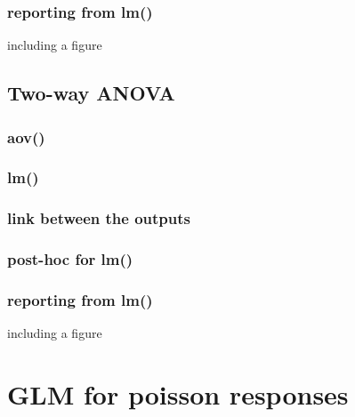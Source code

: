 \documentclass[
]{book}
\begin{document}
\hypertarget{reporting-from-lm-1}{%
\subsection{reporting from lm()}\label{reporting-from-lm-1}}

including a figure

\hypertarget{two-way-anova}{%
\section{Two-way ANOVA}\label{two-way-anova}}

\hypertarget{aov-1}{%
\subsection{aov()}\label{aov-1}}

\hypertarget{lm-2}{%
\subsection{lm()}\label{lm-2}}

\hypertarget{link-between-the-outputs-2}{%
\subsection{link between the outputs}\label{link-between-the-outputs-2}}

\hypertarget{post-hoc-for-lm-1}{%
\subsection{post-hoc for lm()}\label{post-hoc-for-lm-1}}

\hypertarget{reporting-from-lm-2}{%
\subsection{reporting from lm()}\label{reporting-from-lm-2}}

including a figure

\hypertarget{section}{%
\section{}\label{section}}

\hypertarget{pois}{%
\chapter{GLM for poisson responses}\label{pois}}
\end{document}
